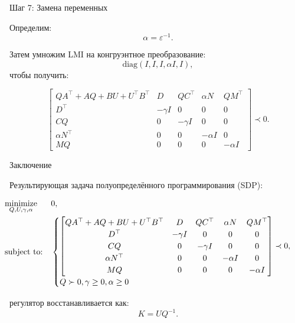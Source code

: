 \documentclass{beamer}
\begin{document}
\begin{frame}{Шаг 7: Замена переменных}
	\begin{flushleft}
		
		Определим:
		\[
		\alpha = \varepsilon^{-1}.
		\]
		
		Затем умножим LMI на конгруэнтное преобразование:
		\[
		\mathrm{diag}(I, I, I, \alpha I, I),
		\]
		чтобы получить:
		
		\[
		\begin{bmatrix}
			QA^\top + AQ + BU + U^\top B^\top
			& D
			& QC^\top
			& \alpha N
			& Q M^\top \\
			D^\top
			& -\gamma I
			& 0
			& 0
			& 0 \\
			CQ
			& 0
			& -\gamma I
			& 0
			& 0 \\
			\alpha N^\top
			& 0
			& 0
			& -\alpha I
			& 0 \\
			M Q
			& 0
			& 0
			& 0
			& -\alpha I
		\end{bmatrix}
		\prec 0.
		\]
		
	\end{flushleft}
\end{frame}


\begin{frame}{Заключение}
	\begin{flushleft}
		
		{\small 
			Результирующая задача полуопределённого программирования (SDP):
			
			
			\begin{equation}
				\label{robust_stability_sdp}
				\hspace*{-0.5cm} 
				\begin{aligned}
					& \underset{Q, U, \gamma, \alpha}{\text{minimize}} 
					& &  0, \\
					& \text{subject to:} & & 
					\begin{cases}
						\begin{bmatrix}
							QA^\top + AQ + BU + U^\top B^\top
							& D
							& QC^\top
							& \alpha N
							& Q M^\top \\
							D^\top
							& -\gamma I
							& 0
							& 0
							& 0 \\
							CQ
							& 0
							& -\gamma I
							& 0
							& 0 \\
							\alpha N^\top
							& 0
							& 0
							& -\alpha I
							& 0 \\
							M Q
							& 0
							& 0
							& 0
							& -\alpha I
						\end{bmatrix}
						\prec 0, \\ 
						Q \succ 0, 
						\gamma \geq 0, \alpha \geq 0
					\end{cases}
				\end{aligned}
			\end{equation}
			
			
			регулятор восстанавливается как:
			\[
			K = U Q^{-1}.
			\]
			
		}
	\end{flushleft}
\end{frame}


\myqrframe
\end{document}
